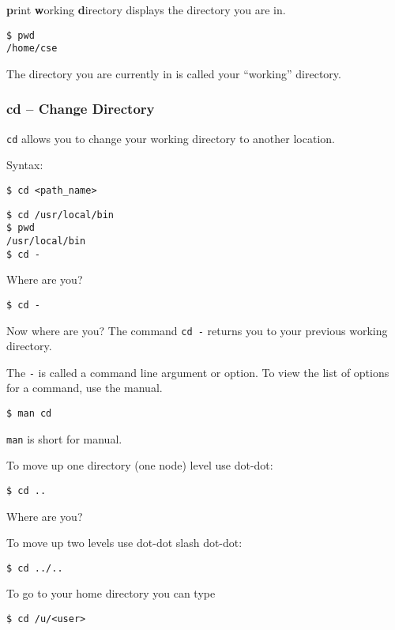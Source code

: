 \documentclass[11pt]{cselabheader}
\begin{document}
\textbf{p}rint \textbf{w}orking \textbf{d}irectory displays the
directory you are in.  

\begin{lstlisting}[style=bash]
$ pwd
/home/cse
\end{lstlisting}

The directory you are currently in is called your ``working'' directory.

\subsubsection{cd -- Change Directory}
\texttt{cd} allows you to change your working directory to another location.

Syntax:
\begin{lstlisting}[style=bash]
$ cd <path_name>
\end{lstlisting}


\begin{lstlisting}[style=bash]
$ cd /usr/local/bin
$ pwd
/usr/local/bin
$ cd -
\end{lstlisting}

Where are you?

\begin{lstlisting}[style=bash]
$ cd -
\end{lstlisting}

Now where are you? The command \texttt{cd -} returns you to your previous
working directory.

The \texttt{-} is called a command line argument or option. To view
the list of options for a command, use the manual.

\begin{lstlisting}[style=bash]
$ man cd
\end{lstlisting}

\texttt{man} is short for manual.

To move up one directory (one node) level use dot-dot:
\begin{lstlisting}[style=bash]
$ cd ..
\end{lstlisting}
Where are you?

To move up two levels use dot-dot slash dot-dot:
\begin{lstlisting}[style=bash]
$ cd ../..
\end{lstlisting}

To go to your home directory you can type
\begin{lstlisting}[style=bash]
$ cd /u/<user>
\end{lstlisting}
\end{document}
